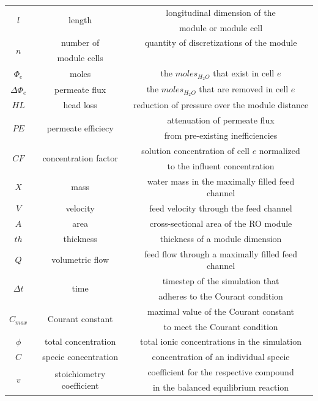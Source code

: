 \begin{supplementary}
\begin{longtable}{c|c|c}
    \multirow{2}{1.5em}{$l$} & \multirow{2}{3em}{length} & longitudinal dimension of the\\& & module or module cell \\ \midrule
    \multirow{2}{1.5em}{$n$} & number of & quantity of discretizations of the module \\ & module cells & \\ \midrule
    $\Phi_e$ & moles & the $moles_{H_2O}$ that exist in cell $e$ \\ \midrule  
    $\Delta \Phi_e$ & permeate flux & the $moles_{H_2O}$ that are removed in cell $e$ \\ \midrule  
    $HL$ & head loss & reduction of pressure over the module distance \\ \midrule
    \multirow{2}{2em}{$PE$} & \multirow{2}{3em}{permeate efficiecy} & attenuation of permeate flux \\& & from pre-existing inefficiencies \\ \midrule  
    \multirow{2}{2em}{$CF$} & \multirow{2}{3em}{concentration factor} & solution concentration of cell $e$ normalized \\& & to the influent concentration \\ \midrule
    $X$ & mass & water mass in the maximally filled feed channel \\ \midrule
    $V$ & velocity & feed velocity through the feed channel \\ \midrule
    $A$ & area & cross-sectional area of the RO module \\ \midrule
    $th$ & thickness & thickness of a module dimension \\ \midrule
    $Q$ & volumetric flow & feed flow through a maximally filled feed channel \\ \midrule
    \multirow{2}{1.5em}{$\Delta t$} & \multirow{2}{3em}{time} & timestep of the simulation that \\& & adheres to the Courant condition \\ \midrule
    \multirow{2}{2em}{$C_{max}$} & \multirow{2}{3em}{Courant constant} & maximal value of the Courant constant \\& & to meet the Courant condition \\ \midrule
    $\phi$ & total concentration & total ionic concentrations in the simulation \\ \midrule
    $C$ & specie concentration & concentration of an individual specie \\ \midrule
    \multirow{2}{1em}{$v$} & \multirow{2}{3em}{stoichiometry coefficient} & coefficient for the respective compound \\& & in the balanced equilibrium reaction \\ \midrule

\end{longtable}
\end{supplementary}
